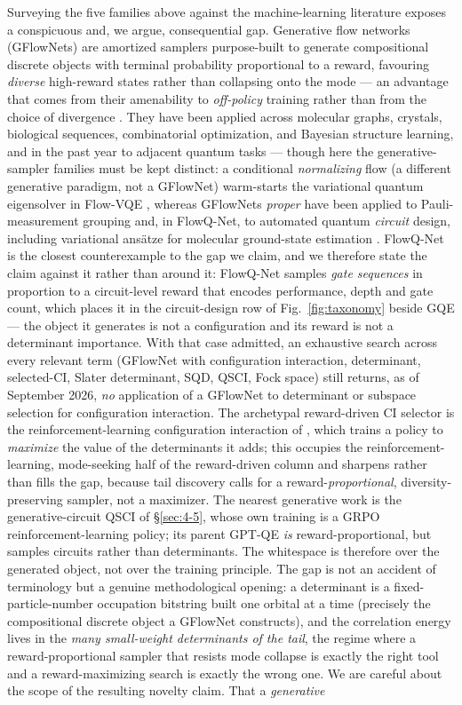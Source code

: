 \documentclass[onecolumn,a4paper]{quantumarticle}
\begin{document}
Surveying the five families above against the machine-learning literature exposes a conspicuous and, we argue, consequential gap. Generative flow networks (GFlowNets) \cite{bengio2021,malkin2022} are amortized samplers purpose-built to generate compositional discrete objects with terminal probability proportional to a reward, favouring \emph{diverse} high-reward states rather than collapsing onto the mode --- an advantage that comes from their amenability to \emph{off-policy} training rather than from the choice of divergence \cite{malkin2023}. They have been applied across molecular graphs, crystals, biological sequences, combinatorial optimization, and Bayesian structure learning, and in the past year to adjacent quantum tasks --- though here the generative-sampler families must be kept distinct: a conditional \emph{normalizing} flow (a different generative paradigm, not a GFlowNet) warm-starts the variational quantum eigensolver in Flow-VQE \cite{zou2026}, whereas GFlowNets \emph{proper} have been applied to Pauli-measurement grouping \cite{gfnmeas2024,flowmeas2025} and, in FlowQ-Net, to automated quantum \emph{circuit} design, including variational ans\"atze for molecular ground-state estimation \cite{flowqnet2025}. FlowQ-Net is the closest counterexample to the gap we claim, and we therefore state the claim against it rather than around it: FlowQ-Net samples \emph{gate sequences} in proportion to a circuit-level reward that encodes performance, depth and gate count, which places it in the circuit-design row of Fig.~\ref{fig:taxonomy} beside GQE --- the object it generates is not a configuration and its reward is not a determinant importance. With that case admitted, an exhaustive search across every relevant term (GFlowNet with configuration interaction, determinant, selected-CI, Slater determinant, SQD, QSCI, Fock space) still returns, as of September 2026, \emph{no} application of a GFlowNet to determinant or subspace selection for configuration interaction. The archetypal reward-driven CI selector is the reinforcement-learning configuration interaction of \cite{goings2021}, which trains a policy to \emph{maximize} the value of the determinants it adds; this occupies the reinforcement-learning, mode-seeking half of the reward-driven column and sharpens rather than fills the gap, because tail discovery calls for a reward-\emph{proportional}, diversity-preserving sampler, not a maximizer. The nearest generative work is the generative-circuit QSCI of \S\ref{sec:4-5}, whose own training is a GRPO reinforcement-learning policy; its parent GPT-QE \emph{is} reward-proportional, but samples circuits rather than determinants. The whitespace is therefore over the generated object, not over the training principle. The gap is not an accident of terminology but a genuine methodological opening: a determinant is a fixed-particle-number occupation bitstring built one orbital at a time (precisely the compositional discrete object a GFlowNet constructs), and the correlation energy lives in the \emph{many small-weight determinants of the tail}, the regime where a reward-proportional sampler that resists mode collapse is exactly the right tool and a reward-maximizing search is exactly the wrong one. We are careful about the scope of the resulting novelty claim. That a \emph{generative} 
\end{document}
